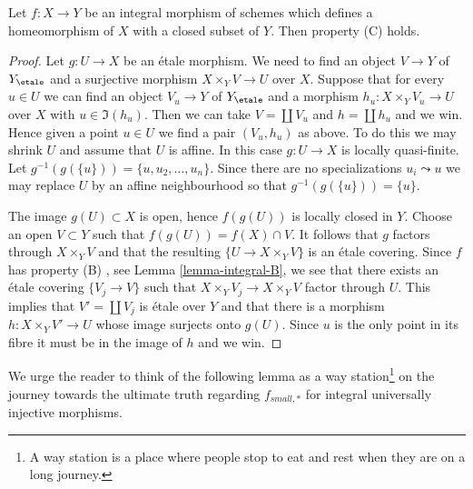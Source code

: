 \begin{lemma}
\label{lemma-integral-homeo-onto-image-C}
Let $f : X \to Y$ be an integral morphism of schemes which defines
a homeomorphism of $X$ with a closed subset of $Y$.
Then property (C) holds.
\end{lemma}

\begin{proof}
Let $g : U \to X$ be an \'etale morphism. We need to find an object
$V \to Y$ of $Y_\etale$ and a surjective morphism $X \times_Y V \to U$
over $X$. Suppose that for every $u \in U$ we can find an object
$V_u \to Y$ of $Y_\etale$ and a morphism $h_u : X \times_Y V_u \to U$
over $X$ with $u \in \Im(h_u)$. Then we can take $V = \coprod V_u$
and $h = \coprod h_u$ and we win. Hence given a point
$u \in U$ we find a pair $(V_u, h_u)$ as above. To do this we may
shrink $U$ and assume that $U$ is affine. In this case
$g : U \to X$ is locally quasi-finite. Let
$g^{-1}(g(\{u\})) = \{u, u_2, \ldots, u_n\}$. Since there are no
specializations $u_i \leadsto u$ we may replace $U$ by an affine neighbourhood
so that $g^{-1}(g(\{u\})) = \{u\}$.

\medskip\noindent
The image $g(U) \subset X$ is open,
hence $f(g(U))$ is locally closed in $Y$. Choose an open $V \subset Y$ such
that $f(g(U)) = f(X) \cap V$. It follows that $g$ factors through
$X \times_Y V$ and that the resulting $\{U \to X \times_Y V\}$ is an \'etale
covering. Since $f$ has property (B) , see
Lemma \ref{lemma-integral-B},
we see that there exists an \'etale covering $\{V_j \to V\}$ such that
$X \times_Y V_j \to X \times_Y V$ factor through $U$.
This implies that $V' = \coprod V_j$ is \'etale over $Y$ and that there is a
morphism $h : X \times_Y V' \to U$ whose image
surjects onto $g(U)$. Since $u$ is the only point in its fibre it must
be in the image of $h$ and we win.
\end{proof}

\noindent
We urge the reader to think of the following lemma as a
way station\footnote{A way station is a place where people stop to eat
and rest when they are on a long journey.} on the journey towards the
ultimate truth regarding $f_{small, *}$ for integral universally injective
morphisms.

